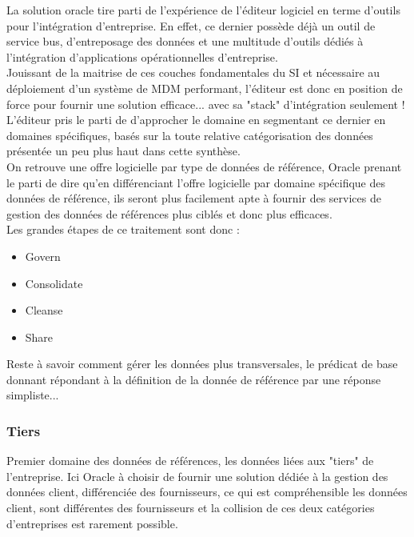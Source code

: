 La solution oracle tire parti de l'expérience de l'éditeur logiciel en terme d'outils pour l'intégration d'entreprise. En effet, ce dernier possède déjà un outil de service bus, d'entreposage des données et une multitude d'outils dédiés à l'intégration d'applications opérationnelles d'entreprise.\\
Jouissant de la maitrise de ces couches fondamentales du SI et nécessaire  au déploiement d'un système de MDM performant, l'éditeur est donc en position de force pour fournir une solution efficace... avec sa "stack" d'intégration seulement ! \\
L'éditeur pris le parti de d'approcher le domaine en segmentant ce dernier en domaines spécifiques, basés sur la toute relative catégorisation des données présentée un peu plus haut dans cette synthèse.\\
On retrouve une offre logicielle par type de données de référence, Oracle prenant le parti de dire qu'en différenciant l'offre logicielle par domaine spécifique des données de référence, ils seront plus facilement apte à fournir des services de gestion des données de références plus ciblés et donc plus efficaces.\\
Les grandes étapes de ce traitement sont donc :\\

\begin{itemize}
\item Govern
\item Consolidate
\item Cleanse
\item Share
\end{itemize}

Reste à savoir comment gérer les données plus transversales, le prédicat de base donnant répondant à la définition de la donnée de référence par une réponse simpliste...\\

\subsubsection{Tiers}

Premier domaine des données de références, les données liées aux "tiers" de l'entreprise. Ici Oracle à  choisir de fournir une solution dédiée à la gestion des données client, différenciée des fournisseurs, ce qui est compréhensible les données client, sont différentes des fournisseurs et la collision de ces deux catégories d'entreprises est rarement possible.\\

